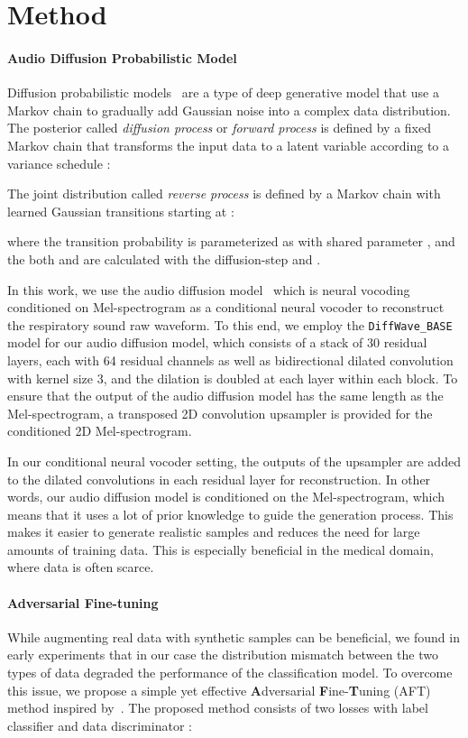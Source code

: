 \documentclass{article}
\begin{document}
\section{Method}
\paragraph{Audio Diffusion Probabilistic Model} 
Diffusion probabilistic models~\cite{ho2020denoising} are a type of deep generative model that use a Markov chain to gradually add Gaussian noise  into a complex data distribution. 
The posterior  called \emph{diffusion process} or \emph{forward process} is defined by a fixed Markov chain that transforms the input data  to a latent variable  according to a variance schedule :

The joint distribution  called \emph{reverse process} is defined by a Markov chain with learned Gaussian transitions starting at :

where the transition probability  is parameterized as  with shared parameter , and the both  and  are calculated with the diffusion-step and . 

In this work, we use the audio diffusion model~\cite{kong2020diffwave} which is neural vocoding conditioned on Mel-spectrogram as a conditional neural vocoder to reconstruct the respiratory sound raw waveform. To this end, we employ the \verb|DiffWave_BASE| model for our audio diffusion model, which consists of a stack of 30 residual layers, each with 64 residual channels as well as bidirectional dilated convolution with kernel size 3, and the dilation is doubled at each layer within each block. To ensure that the output of the audio diffusion model has the same length as the Mel-spectrogram, a transposed 2D convolution upsampler is provided for the conditioned 2D Mel-spectrogram. 

In our conditional neural vocoder setting, the outputs of the upsampler are added to the dilated convolutions in each residual layer for reconstruction. In other words, our audio diffusion model is conditioned on the Mel-spectrogram, which means that it uses a lot of prior knowledge to guide the generation process. This makes it easier to generate realistic samples and reduces the need for large amounts of training data. This is especially beneficial in the medical domain, where data is often scarce.








\paragraph{Adversarial Fine-tuning} While augmenting real data with synthetic samples can be beneficial, we found in early experiments that in our case the distribution mismatch between the two types of data degraded the performance of the classification model.
To overcome this issue, we propose a simple yet effective \textbf{A}dversarial \textbf{F}ine-\textbf{T}uning (AFT) method inspired by~\cite{ganin2016domain}. The proposed method consists of two losses with label classifier  and data discriminator :
\end{document}

